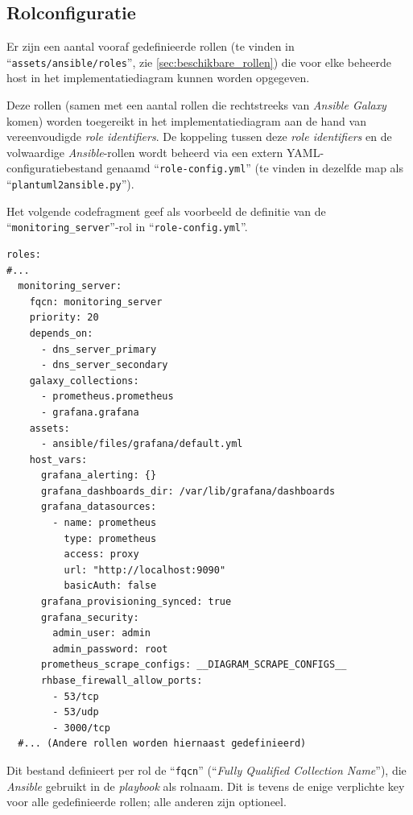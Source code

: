 \subsection{Rolconfiguratie}%
\label{subsec:rolconfiguratie}

Er zijn een aantal vooraf gedefinieerde rollen (te vinden in ``\texttt{assets/ansible/roles}'', zie \autoref{sec:beschikbare_rollen}) die voor elke beheerde host in het implementatiediagram kunnen worden opgegeven.

Deze rollen (samen met een aantal rollen die rechtstreeks van \emph{Ansible Galaxy} komen) worden toegereikt in het implementatiediagram aan de hand van vereenvoudigde \emph{role identifiers}. De koppeling tussen deze \emph{role identifiers} en de volwaardige \emph{Ansible}-rollen wordt beheerd via een extern YAML-configuratiebestand genaamd ``\texttt{role-config.yml}'' (te vinden in dezelfde map als ``\texttt{plantuml2ansible.py}'').

Het volgende codefragment geef als voorbeeld de definitie van de \\``\texttt{monitoring\_server}''-rol in ``\texttt{role-config.yml}''.

\begin{codeblock}
  \begin{verbatim}
roles:
#...
  monitoring_server:
    fqcn: monitoring_server
    priority: 20
    depends_on:
      - dns_server_primary
      - dns_server_secondary
    galaxy_collections:
      - prometheus.prometheus
      - grafana.grafana
    assets:
      - ansible/files/grafana/default.yml
    host_vars:
      grafana_alerting: {}
      grafana_dashboards_dir: /var/lib/grafana/dashboards
      grafana_datasources:
        - name: prometheus
          type: prometheus
          access: proxy
          url: "http://localhost:9090"
          basicAuth: false
      grafana_provisioning_synced: true
      grafana_security:
        admin_user: admin
        admin_password: root
      prometheus_scrape_configs: __DIAGRAM_SCRAPE_CONFIGS__
      rhbase_firewall_allow_ports:
        - 53/tcp
        - 53/udp
        - 3000/tcp
  #... (Andere rollen worden hiernaast gedefinieerd)
\end{verbatim}
  \caption[Voorbeeld role-config.yml]{Vereenvoudigde rolinvoer in ``\texttt{role-config.yml}''}
  \label{code:vb_roleconfig}
\end{codeblock}

Dit bestand definieert per rol de ``\texttt{fqcn}'' (``\emph{Fully Qualified Collection Name}''), die \emph{Ansible} gebruikt in de \emph{playbook} als rolnaam. Dit is tevens de enige verplichte key voor alle gedefinieerde rollen; alle anderen zijn optioneel.

